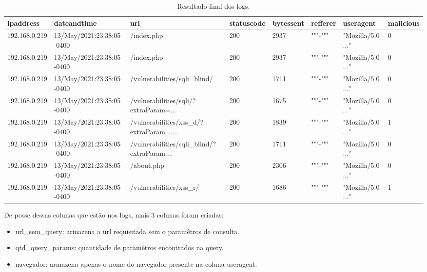 \begin{table}
\centering

\begin{tabular}{|l|l|l|l|l|l|l|l|}
\hline
    ipaddress & dateandtime & url & statuscode & bytessent & refferer & useragent & malicious \\ \hline
    192.168.0.219 & 13/May/2021:23:38:05 -0400 & /index.php & 200 & 2937 & """-""" & "Mozilla/5.0 ..." & 0 \\ \hline
    192.168.0.219 & 13/May/2021:23:38:05 -0400 & /index.php & 200 & 2937 & """-""" & "Mozilla/5.0 ..." & 0 \\ \hline
    192.168.0.219 & 13/May/2021:23:38:05 -0400 & /vulnerabilities/sqli\_blind/ & 200 & 1711 & """-""" & "Mozilla/5.0 ..." & 0 \\ \hline
    192.168.0.219 & 13/May/2021:23:38:05 -0400 & /vulnerabilities/sqli/?extraParam=... & 200 & 1675 & """-""" & "Mozilla/5.0 ..." & 0 \\ \hline
    192.168.0.219 & 13/May/2021:23:38:05 -0400 & /vulnerabilities/xss\_d/?extraParam=.... & 200 & 1839 & """-""" & "Mozilla/5.0 ..." & 1 \\ \hline
    192.168.0.219 & 13/May/2021:23:38:05 -0400 & /vulnerabilities/sqli\_blind/?extraParam.... & 200 & 1711 & """-""" & "Mozilla/5.0 ..." & 0 \\ \hline
    192.168.0.219 & 13/May/2021:23:38:05 -0400 & /about.php & 200 & 2306 & """-""" & "Mozilla/5.0 ..." & 0 \\ \hline
    192.168.0.219 & 13/May/2021:23:38:05 -0400 & /vulnerabilities/xss\_r/ & 200 & 1686 & """-""" & "Mozilla/5.0 ..." & 1 \\ \hline
\end{tabular}

\caption{Resultado final dos logs.\label{tab:exemplo_log}}

\end{table}

De posse dessas colunas que estão nos logs, mais 3 colunas foram criadas:

\begin{itemize}
    \item url\_sem\_query: armazena a url requisitada sem o paramêtros de consulta.
    \item qtd\_query\_params: quantidade de paramêtros encontrados na query.
    \item navegador: armazena apenas o nome do navegador presente na coluna useragent.
\end{itemize}


